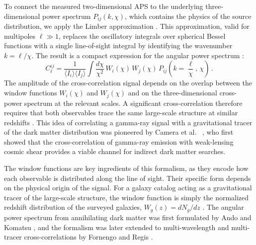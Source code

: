 To connect the measured two-dimensional APS to the underlying three-dimensional power spectrum $P_{ij}(k,\chi)$, which contains the physics of the source distribution, we apply the Limber approximation \cite{Limber:1953apj}.
This approximation, valid for multipoles $\ell \gg 1$, replaces the oscillatory integrals over spherical Bessel functions with a single line-of-sight integral by identifying the wavenumber $k = \ell / \chi$.
The result is a compact expression for the angular power spectrum \cite{Fornengo:2013rga,Camera:2012cj}:
\begin{equation}
	C_\ell^{ij} = \frac{1}{\langle I_i \rangle \langle I_j \rangle} \int \frac{d\chi}{\chi^2}\, W_i(\chi)\, W_j(\chi)\, P_{ij}\!
	\left(k = \frac{\ell}{\chi},\, \chi\right)\,.
	\label{eq:limber_aps}
\end{equation}
The amplitude of the cross-correlation signal depends on the overlap between the window functions $W_i(\chi)$ and $W_j(\chi)$ and on the three-dimensional cross-power spectrum at the relevant scales.
A significant cross-correlation therefore requires that both observables trace the same large-scale structure at similar redshifts \cite{Fornengo:2013rga}.
This idea of correlating a gamma-ray signal with a gravitational tracer of the dark matter distribution was pioneered by Camera et al.
\ \cite{Camera:2012cj}, who first showed that the cross-correlation of gamma-ray emission with weak-lensing cosmic shear provides a viable channel for indirect dark matter searches.

The window functions are key ingredients of this formalism, as they encode how each observable is distributed along the line of sight.
Their specific form depends on the physical origin of the signal.
For a galaxy catalog acting as a gravitational tracer of the large-scale structure, the window function is simply the normalized redshift distribution of the surveyed galaxies, $W_g(z) = dN_g/dz$ \cite{Fornengo:2013rga}.
The angular power spectrum from annihilating dark matter was first formulated by Ando and Komatsu \cite{Ando:2005xg}, and the formalism was later extended to multi-wavelength and multi-tracer cross-correlations by Fornengo and Regis \cite{Fornengo:2013rga}.

